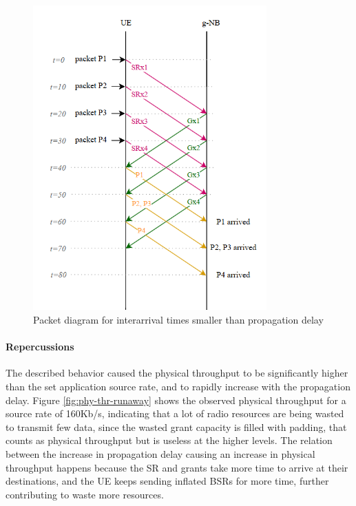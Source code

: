 \begin{figure}[ht]
    \centering
    \includegraphics[width=0.8\textwidth]{res/diagram-inflated-bsr.png}
    \caption{Packet diagram for interarrival times smaller than propagation delay}
    \label{fig:inflated-bsr-diag}
\end{figure}

\paragraph{Repercussions}
The described behavior caused the physical throughput to be significantly higher than the set application source rate, and to rapidly increase with the propagation delay. Figure \ref{fig:phy-thr-runaway} shows the observed physical throughput for a source rate of 160Kb/s, indicating that a lot of radio resources are being wasted to transmit few data, since the wasted grant capacity is filled with padding, that counts as physical throughput but is useless at the higher levels. The relation between the increase in propagation delay causing an increase in physical throughput happens because the \ac{SR} and grants take more time to arrive at their destinations, and the \ac{UE} keeps sending inflated \ac{BSR}s for more time, further contributing to waste more resources.


